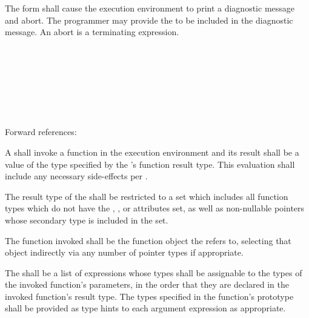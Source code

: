 \specsubsubitem
The  form shall cause the execution environment to print a
diagnostic message and abort. The programmer may provide the
 to be included in the diagnostic message. An
abort is a terminating expression.


\begin{grammar}
 \\
	 \terminal{(}  \terminal{)} \\

 \\
	 \optional{\terminal{,}} \\
	  \optional{\terminal{,}} \\
	 \terminal{,}  \\
\end{grammar}

Forward references: 

\specsubsubitem
A  shall invoke a function in the execution
environment and its result shall be a value of the type specified by the
's function result type. This evaluation shall
include any necessary side-effects per .

\specsubsubitem
The result type of the  shall be restricted to a
set which includes all function types which do not have the ,
, or  attributes set, as well as non-nullable
pointers whose secondary type is included in the set.


\specsubsubitem
The function invoked shall be the function object the
 refers to, selecting that object indirectly via
any number of pointer types if appropriate.

\specsubsubitem
The  shall be a list of expressions whose types
shall be assignable to the types of the invoked function's parameters, in the
order that they are declared in the invoked function's result type. The types
specified in the function's prototype shall be provided as type hints to each
argument expression as appropriate.

